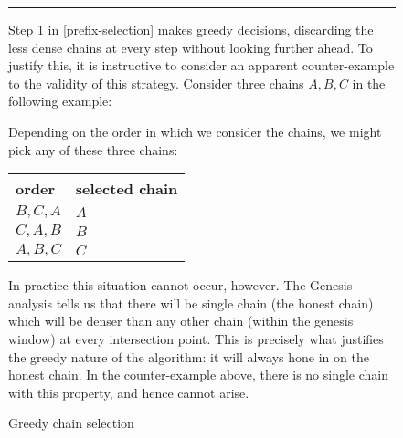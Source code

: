 \begin{figure}[p]
\hrule
\vspace{0.5em}

Step 1 in \cref{prefix-selection} makes greedy decisions, discarding the less
dense chains at every step without looking further ahead. To justify this, it is
instructive to consider an apparent counter-example to the validity of this
strategy. Consider three chains $A, B, C$ in the following example:
%
\begin{center}
\end{center}
%
Depending on the order in which we consider the chains, we might pick any of
these three chains:
%
\begin{center}
\begin{tabular}{l|l}
\textbf{order} & \textbf{selected chain} \\ \hline
$B, C, A$ & $A$ \\
$C, A, B$ & $B$ \\
$A, B, C$ & $C$ \\
\end{tabular}
\end{center}
%
In practice this situation cannot occur, however. The Genesis analysis tells us
that there will be single chain (the honest chain) which will be denser than any
other chain (within the genesis window) at every intersection point. This is
precisely what justifies the greedy nature of the algorithm: it will always hone
in on the honest chain. In the counter-example above, there is no single chain
with this property, and hence cannot arise.
\caption{\label{greedy-chain-selection}Greedy chain selection}
\end{figure}

